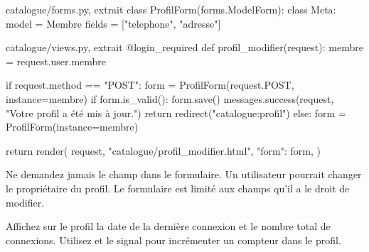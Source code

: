 \begin{correction}
\begin{codebox}[python]{catalogue/forms.py, extrait}
class ProfilForm(forms.ModelForm):
    class Meta:
        model = Membre
        fields = ["telephone", "adresse"]
\end{codebox}

\begin{codebox}[python]{catalogue/views.py, extrait}
@login_required
def profil_modifier(request):
    membre = request.user.membre

    if request.method == "POST":
        form = ProfilForm(request.POST, instance=membre)
        if form.is_valid():
            form.save()
            messages.success(request, "Votre profil a été mis à jour.")
            return redirect("catalogue:profil")
    else:
        form = ProfilForm(instance=membre)

    return render(
        request,
        "catalogue/profil_modifier.html",
        {"form": form},
    )
\end{codebox}

\begin{note}
Ne demandez jamais le champ  dans le formulaire. Un utilisateur pourrait
changer le propriétaire du profil. Le formulaire est limité aux champs qu'il a le
droit de modifier.
\end{note}
\end{correction}

\begin{exercice}
Affichez sur le profil la date de la dernière connexion et le nombre total de
connexions. Utilisez  et le signal 
pour incrémenter un compteur dans le profil.
\end{exercice}

